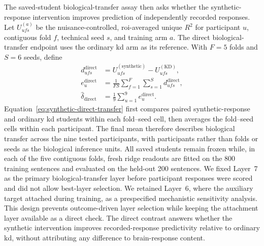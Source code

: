 The saved-student biological-transfer assay then asks whether the synthetic-response intervention improves prediction of independently recorded responses.
Let \(U_{ufs}^{(a)}\) be the nuisance-controlled, \ac{roi}-averaged unique \(R^2\) for participant \(u\), contiguous fold \(f\), technical seed \(s\), and training arm \(a\).
The direct biological-transfer endpoint uses the ordinary \ac{kd} arm as its reference.
With \(F=5\) folds and \(S=6\) seeds, define
\begin{equation}
\begin{aligned}
d_{ufs}^{\mathrm{direct}}
&=
U_{ufs}^{(\mathrm{synthetic})}
-
U_{ufs}^{(\mathrm{KD})},
\\
e_u^{\mathrm{direct}}
&=
\frac{1}{FS}
\sum_{f=1}^{F}
\sum_{s=1}^{S}
d_{ufs}^{\mathrm{direct}},
\\
\widehat{\delta}_{\mathrm{direct}}
&=
\frac{1}{9}
\sum_{u=1}^{9}
e_u^{\mathrm{direct}}.
\end{aligned}
\label{eq:synthetic-direct-transfer}
\end{equation}
Equation~\ref{eq:synthetic-direct-transfer} first compares paired synthetic-response and ordinary \ac{kd} students within each fold--seed cell, then averages the fold--seed cells within each participant.
The final mean therefore describes biological transfer across the nine tested participants, with participants rather than folds or seeds as the biological inference units.
All saved students remain frozen while, in each of the five contiguous folds, fresh ridge readouts are fitted on the 800 training sentences and evaluated on the held-out 200 sentences.
We fixed Layer~7 as the primary biological-transfer layer before participant responses were scored and did not allow best-layer selection.
We retained Layer~6, where the auxiliary target attached during training, as a prespecified mechanistic sensitivity analysis.
This design prevents outcome-driven layer selection while keeping the attachment layer available as a direct check.
The direct contrast answers whether the synthetic intervention improves recorded-response predictivity relative to ordinary \ac{kd}, without attributing any difference to brain-response content.

